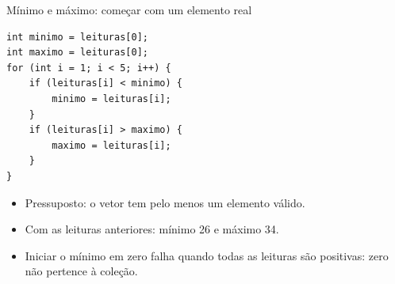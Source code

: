 \begin{frame}[fragile]{Mínimo e máximo: começar com um elemento real}
\begin{lstlisting}
int minimo = leituras[0];
int maximo = leituras[0];
for (int i = 1; i < 5; i++) {
    if (leituras[i] < minimo) {
        minimo = leituras[i];
    }
    if (leituras[i] > maximo) {
        maximo = leituras[i];
    }
}
\end{lstlisting}
\begin{itemize}
\item Pressuposto: o vetor tem pelo menos um elemento válido.
\item Com as leituras anteriores: mínimo 26 e máximo 34.
\item Iniciar o mínimo em zero falha quando todas as leituras são positivas: zero não pertence à coleção.
\end{itemize}
\end{frame}
